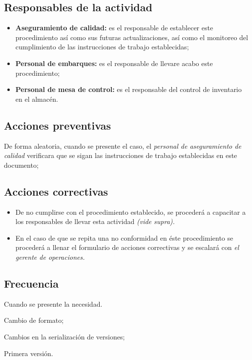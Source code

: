 \subsection{Responsables de la actividad}
\begin{itemize}
	\item \textbf{Aseguramiento de calidad:} es el responsable de establecer este procedimiento así como sus futuras actualizaciones, así como el monitoreo del cumplimiento de las instrucciones de trabajo establecidas;
	\item \textbf{Personal de embarques:} es el responsable de llevare acabo este procedimiento;
	\item \textbf{Personal de mesa de control:} es el responsable del control de inventario en el almacén.
\end{itemize}

\subsection{Acciones preventivas}
De forma aleatoria, cuando se presente el caso, el \emph{personal de aseguramiento de calidad} verificara que se sigan las instrucciones de trabajo establecidas en este documento;

\subsection{Acciones correctivas}
\begin{itemize}
	\item De no cumplirse con el procedimiento establecido, se procederá a capacitar a los responsables de llevar esta actividad \emph{(vide supra).}
	\item En el caso de que se repita una no conformidad en éste procedimiento se procederá a llenar el formulario de acciones correctivas y se escalará con \emph{el gerente de operaciones.}
\end{itemize}

\subsection{Frecuencia}

Cuando se presente la necesidad.

\begin{changelog}[title=Registro de cambios,simple, sectioncmd=\subsection*,label=changelog-\thesection-\MayorVer.\MenorVer6]
	\begin{version}[v=\MayorVer.\MenorVer, date=2023--01, author=Pablo E. Alanis]
		\item Cambio de formato;
		\item Cambios en la serialización de versiones;
	\end{version}

	\begin{version}[v=1.0, date=2022--05, author=Alonso M.]
		\item Primera versión.
	\end{version}

\end{changelog}
